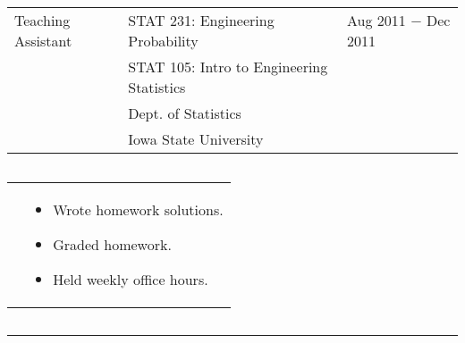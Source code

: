 \documentclass{article}
\newcommand{\q}{$\quad$ \newline}
\newcommand{\vl}{4.25}
\newcommand{\wl}{8.4}
\newcommand{\ww}{13}
\newcommand{\myrule}{\noindent \rule{\textwidth}{1pt}}
\begin{document}
\noindent \begin{tabular}{@{}p{\vl cm}p{\wl cm}l@{}}
Teaching Assistant & STAT 231: Engineering Probability & Aug 2011 $-$ Dec 2011 \\
& STAT 105: Intro to Engineering Statistics & \\
& Dept. of Statistics & \\
& Iowa State University & \\
\end{tabular} \q 

\noindent \begin{tabular}{@{}p{\vl cm}p{\ww cm}@{}}
& \begin{itemize}
\item Wrote homework solutions. 
\item Graded homework. 
\item Held weekly office hours.
\end{itemize}
\end{tabular} \q 






\myrule
\end{document}
